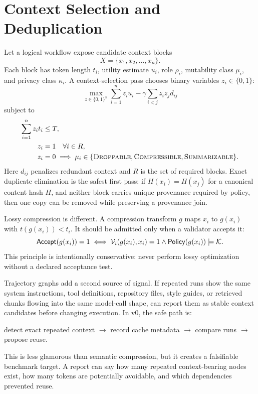 \section{Context Selection and Deduplication}

Let a logical workflow expose candidate context blocks
\begin{equation}
X = \{x_1, x_2, \ldots, x_n\}.
\end{equation}
Each block has token length $t_i$, utility estimate $u_i$, role $\rho_i$, mutability class $\mu_i$, and privacy class $\kappa_i$. A context-selection pass chooses binary variables $z_i \in \{0,1\}$:
\begin{equation}
\max_{z \in \{0,1\}^n}
\sum_{i=1}^n z_i u_i - \gamma \sum_{i<j} z_i z_j d_{ij}
\label{eq:context_objective}
\end{equation}
subject to
\begin{align}
\sum_{i=1}^n z_i t_i &\leq T, \label{eq:token_budget}\\
z_i &= 1 \quad \forall i \in R, \label{eq:required_context}\\
z_i &= 0 \implies \mu_i \in \{\textsc{Droppable},\textsc{Compressible},\textsc{Summarizable}\}. \label{eq:mutability}
\end{align}
Here $d_{ij}$ penalizes redundant context and $R$ is the set of required blocks. Exact duplicate elimination is the safest first pass: if $H(x_i)=H(x_j)$ for a canonical content hash $H$, and neither block carries unique provenance required by policy, then one copy can be removed while preserving a provenance join.

Lossy compression is different. A compression transform $g$ maps $x_i$ to $g(x_i)$ with $t(g(x_i)) < t_i$. It should be admitted only when a validator accepts it:
\begin{equation}
\mathsf{Accept}(g(x_i)) = 1 \iff \mathcal{V}_i(g(x_i),x_i)=1 \wedge \mathsf{Policy}(g(x_i))\models \mathcal{K}.
\end{equation}
This principle is intentionally conservative: never perform lossy optimization without a declared acceptance test.

Trajectory graphs add a second source of signal. If repeated runs show the same system instructions, tool definitions, repository files, style guides, or retrieved chunks flowing into the same model-call shape, \migaki{} can report them as stable context candidates before changing execution. In v0, the safe path is:

\begin{center}
detect exact repeated context $\rightarrow$ record cache metadata $\rightarrow$ compare runs $\rightarrow$ propose reuse.
\end{center}

This is less glamorous than semantic compression, but it creates a falsifiable benchmark target. A report can say how many repeated context-bearing nodes exist, how many tokens are potentially avoidable, and which dependencies prevented reuse.
